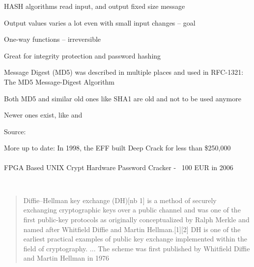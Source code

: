 \documentclass[Screen16to9,17pt]{foils}
\begin{document}


\begin{list2}
\item HASH algorithms read input, and output fixed size message 
\item Output values varies a lot even with small input changes -- goal
\item One-way functions -- irreversible
\item Great for integrity protection and password hashing
\item Message Digest (MD5) was described in multiple places and used in RFC-1321: The MD5 Message-Digest
  Algorithm
\item Both MD5 and similar old ones like SHA1 are old and not to be used anymore
\item Newer ones exist, like  and 
\end{list2}



Source: 

{\small
More up to date:  In 1998, the EFF built Deep Crack for less than \$250,000\\
\\
FPGA Based UNIX Crypt Hardware Password Cracker - ~100 EUR in 2006\\
}



{~}

\begin{quote}
Diffie–Hellman key exchange (DH)[nb 1] is a method of securely exchanging cryptographic keys over a public channel and was one of the first public-key protocols as originally conceptualized by Ralph Merkle and named after Whitfield Diffie and Martin Hellman.[1][2] DH is one of the earliest practical examples of public key exchange implemented within the field of cryptography.
... The scheme was first published by Whitfield Diffie and Martin Hellman in 1976
\end{quote}
\end{document}
